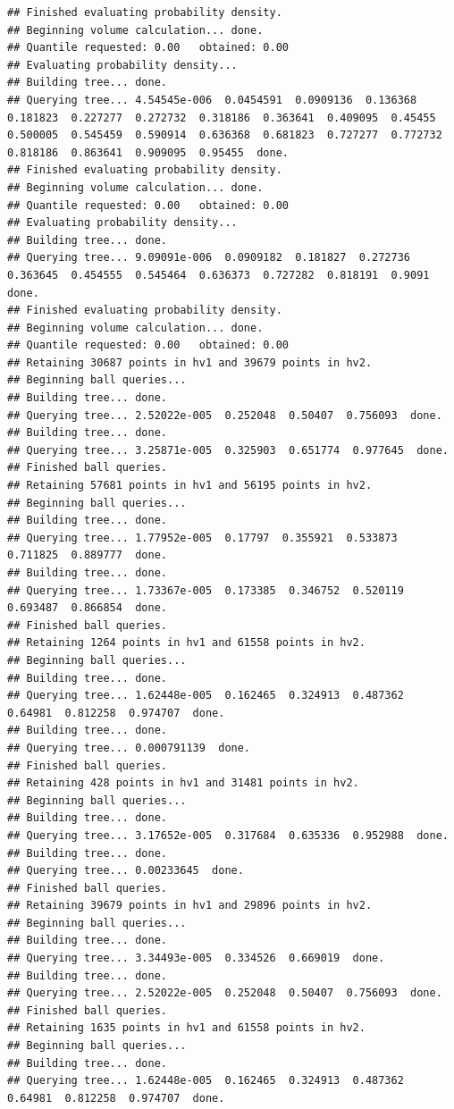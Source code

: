 \documentclass[12pt]{article}\usepackage[]{graphicx}\usepackage[]{color}
\makeatletter
\newenvironment{kframe}{%
 \def\at@end@of@kframe{}%
 \ifinner\ifhmode%
  \def\at@end@of@kframe{\end{minipage}}%
  \begin{minipage}{\columnwidth}%
 \fi\fi%
 \def\FrameCommand##1{\hskip\@totalleftmargin \hskip-\fboxsep
 \colorbox{shadecolor}{##1}\hskip-\fboxsep
     \hskip-\linewidth \hskip-\@totalleftmargin \hskip\columnwidth}%
 \MakeFramed {\advance\hsize-\width
   \@totalleftmargin\z@ \linewidth\hsize
   \@setminipage}}%
 {\par\unskip\endMakeFramed%
 \at@end@of@kframe}
\newenvironment{knitrout}{}{} %
\makeatother
\begin{document}
\begin{knitrout}
\begin{kframe}
\begin{verbatim}
## Finished evaluating probability density.
## Beginning volume calculation... done. 
## Quantile requested: 0.00   obtained: 0.00
## Evaluating probability density...
## Building tree... done.
## Querying tree... 4.54545e-006  0.0454591  0.0909136  0.136368  0.181823  0.227277  0.272732  0.318186  0.363641  0.409095  0.45455  0.500005  0.545459  0.590914  0.636368  0.681823  0.727277  0.772732  0.818186  0.863641  0.909095  0.95455  done.
## Finished evaluating probability density.
## Beginning volume calculation... done. 
## Quantile requested: 0.00   obtained: 0.00
## Evaluating probability density...
## Building tree... done.
## Querying tree... 9.09091e-006  0.0909182  0.181827  0.272736  0.363645  0.454555  0.545464  0.636373  0.727282  0.818191  0.9091  done.
## Finished evaluating probability density.
## Beginning volume calculation... done. 
## Quantile requested: 0.00   obtained: 0.00
## Retaining 30687 points in hv1 and 39679 points in hv2.
## Beginning ball queries... 
## Building tree... done.
## Querying tree... 2.52022e-005  0.252048  0.50407  0.756093  done.
## Building tree... done.
## Querying tree... 3.25871e-005  0.325903  0.651774  0.977645  done.
## Finished ball queries. 
## Retaining 57681 points in hv1 and 56195 points in hv2.
## Beginning ball queries... 
## Building tree... done.
## Querying tree... 1.77952e-005  0.17797  0.355921  0.533873  0.711825  0.889777  done.
## Building tree... done.
## Querying tree... 1.73367e-005  0.173385  0.346752  0.520119  0.693487  0.866854  done.
## Finished ball queries. 
## Retaining 1264 points in hv1 and 61558 points in hv2.
## Beginning ball queries... 
## Building tree... done.
## Querying tree... 1.62448e-005  0.162465  0.324913  0.487362  0.64981  0.812258  0.974707  done.
## Building tree... done.
## Querying tree... 0.000791139  done.
## Finished ball queries. 
## Retaining 428 points in hv1 and 31481 points in hv2.
## Beginning ball queries... 
## Building tree... done.
## Querying tree... 3.17652e-005  0.317684  0.635336  0.952988  done.
## Building tree... done.
## Querying tree... 0.00233645  done.
## Finished ball queries. 
## Retaining 39679 points in hv1 and 29896 points in hv2.
## Beginning ball queries... 
## Building tree... done.
## Querying tree... 3.34493e-005  0.334526  0.669019  done.
## Building tree... done.
## Querying tree... 2.52022e-005  0.252048  0.50407  0.756093  done.
## Finished ball queries. 
## Retaining 1635 points in hv1 and 61558 points in hv2.
## Beginning ball queries... 
## Building tree... done.
## Querying tree... 1.62448e-005  0.162465  0.324913  0.487362  0.64981  0.812258  0.974707  done.

\end{verbatim}
\end{kframe}
\end{knitrout}
\end{document}

